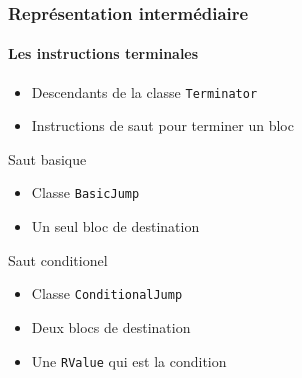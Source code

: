 \documentclass{beamer}
\begin{document}
\begin{frame}
    \frametitle{Représentation intermédiaire}
    \framesubtitle{Les instructions terminales}
    \begin{itemize}
        \item Descendants de la classe \lstinline{Terminator}
        \item Instructions de saut pour terminer un bloc
    \end{itemize}
    \pause
    \begin{block}{Saut basique}
        \begin{itemize}
            \item Classe \lstinline{BasicJump}
            \item Un seul bloc de destination
        \end{itemize}
    \end{block}
    \pause
    \begin{block}{Saut conditionel}
        \begin{itemize}
            \item Classe \lstinline{ConditionalJump}
            \item Deux blocs de destination
            \item Une \lstinline{RValue} qui est la condition
        \end{itemize}
    \end{block}
\end{frame}
\end{document}
